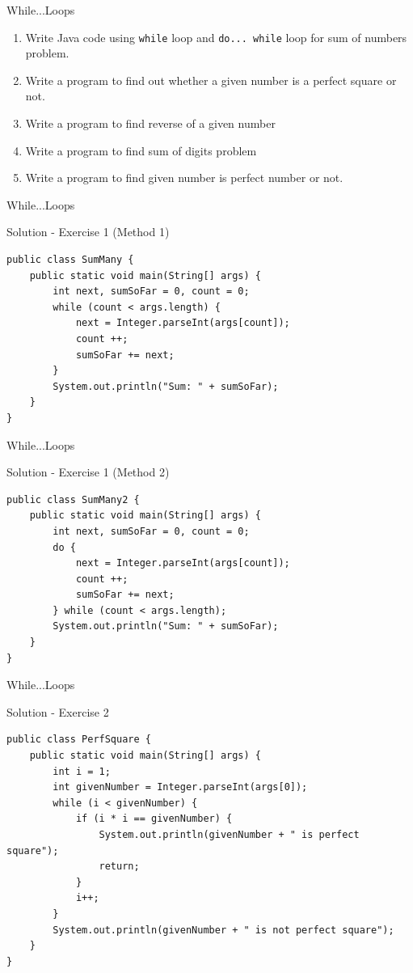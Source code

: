 \documentclass[14pt]{beamer}
\begin{document}
\begin{frame}[fragile]{While...Loops}
 \begin{enumerate}
  \item Write Java code using \lstinline!while! loop and \lstinline!do... while! loop  for sum of numbers problem. 
  \item Write a program to find out whether a given number is a perfect square or not.
  \item Write a program to find reverse of a given number
  \item Write a program to find sum of digits problem
  \item Write a program to find given number is perfect number or not.
 \end{enumerate}
\end{frame}

\begin{frame}[fragile]{While...Loops}
 \begin{block}{Solution - Exercise 1 (Method 1)}
  \begin{lstlisting}[numbers=none]
public class SumMany {
    public static void main(String[] args) {
        int next, sumSoFar = 0, count = 0;
        while (count < args.length) {
            next = Integer.parseInt(args[count]);
            count ++;
            sumSoFar += next;
        }
        System.out.println("Sum: " + sumSoFar);
    }
}
  \end{lstlisting}
 \end{block}
\end{frame}

\begin{frame}[fragile]{While...Loops}
 \begin{block}{Solution - Exercise 1 (Method 2)}
  \begin{lstlisting}[numbers=none]
public class SumMany2 {
    public static void main(String[] args) {
        int next, sumSoFar = 0, count = 0;
        do {
            next = Integer.parseInt(args[count]);
            count ++;
            sumSoFar += next;
        } while (count < args.length);
        System.out.println("Sum: " + sumSoFar);
    }
}
  \end{lstlisting}
 \end{block}
\end{frame}

\begin{frame}[fragile]{While...Loops}
 \begin{block}{Solution - Exercise 2}
  \begin{lstlisting}[numbers=none]
public class PerfSquare {
    public static void main(String[] args) {
        int i = 1;
        int givenNumber = Integer.parseInt(args[0]);
        while (i < givenNumber) {
            if (i * i == givenNumber) {
                System.out.println(givenNumber + " is perfect square");
                return;
            }
            i++;
        }
        System.out.println(givenNumber + " is not perfect square");
    }
}
  \end{lstlisting}
 \end{block}
\end{frame}
\end{document}

